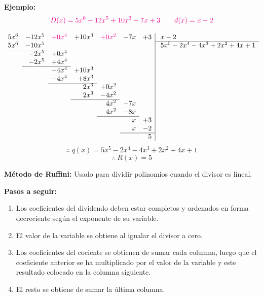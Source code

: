 \documentclass[11pt,a4paper]{article}
\newcommand{\hl}[1]{\textcolor{resaltado}{#1}}
\begin{document}
\textcolor{naranja}{\textbf{Ejemplo:}}
\[
\textcolor{magenta}{D(x) = 5x^6 - 12x^5 + 10x^3 - 7x + 3} \qquad
\textcolor{magenta}{d(x) = x - 2}
\]

{\footnotesize
\[
\begin{array}{rrrrrrr|l}
5x^6 & -12x^5 & \textcolor{magenta}{+0x^4} & +10x^3 & \textcolor{magenta}{+0x^2} & -7x & +3 & \;x-2\\ \cline{8-8}
5x^6 & -10x^5 &        &        &       &     &    & \;5x^5-2x^4-4x^3+2x^2+4x+1\\ \cline{1-2}
     & -2x^5  & +0x^4  &        &       &     &    & \\
     & -2x^5  & +4x^4  &        &       &     &    & \\ \cline{2-3}
     &        & -4x^4  & +10x^3 &       &     &    & \\
     &        & -4x^4  & +8x^3  &       &     &    & \\ \cline{3-4}
     &        &        & 2x^3   & +0x^2 &     &    & \\
     &        &        & 2x^3   & -4x^2 &     &    & \\ \cline{4-5}
     &        &        &        & 4x^2  & -7x &    & \\
     &        &        &        & 4x^2  & -8x &    & \\ \cline{5-6}
     &        &        &        &       & x   & +3 & \\
     &        &        &        &       & x   & -2 & \\ \cline{6-7}
     &        &        &        &       &     & 5  &
\end{array}
\]
}
\[\therefore\; q(x) = 5x^5 - 2x^4 - 4x^3 + 2x^2 + 4x + 1\]
\[\therefore\; R(x) = 5\]

\bigskip
\textcolor{verde}{\textbf{Método de Ruffini:}} Usado para dividir polinomios \hl{cuando el
divisor es lineal.}

\textcolor{verde}{\textbf{Pasos a seguir:}}
\begin{enumerate}
  \item Los coeficientes del dividendo deben estar completos y ordenados en forma
  decreciente según el exponente de su variable.
  \item El valor de la variable se obtiene al igualar el divisor a cero.
  \item Los coeficientes del cociente se obtienen de sumar cada columna, luego que el
  coeficiente anterior se ha multiplicado por el valor de la variable y este resultado
  colocado en la columna siguiente.
  \item El resto se obtiene de sumar la última columna.
\end{enumerate}
\end{document}
